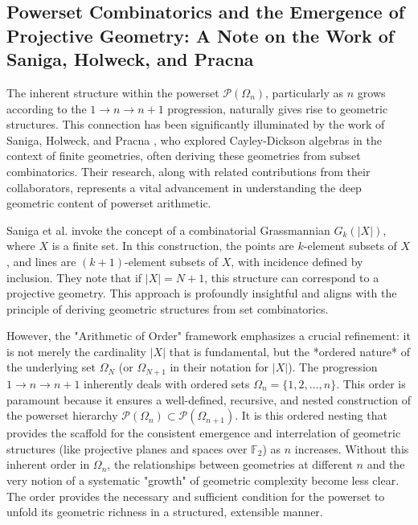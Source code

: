 \documentclass[11pt,a4paper]{article}
\begin{document}
\subsection{Powerset Combinatorics and the Emergence of Projective Geometry: A Note on the Work of Saniga, Holweck, and Pracna}
\label{sec:saniga_projective}

The inherent structure within the powerset $\mathcal{P}(\Omega_n)$, particularly as $n$ grows according to the $1 \to n \to n+1$ progression, naturally gives rise to geometric structures. This connection has been significantly illuminated by the work of Saniga, Holweck, and Pracna \cite{Saniga2014}, who explored Cayley-Dickson algebras in the context of finite geometries, often deriving these geometries from subset combinatorics. Their research, along with related contributions from their collaborators, represents a vital advancement in understanding the deep geometric content of powerset arithmetic.

Saniga et al. invoke the concept of a combinatorial Grassmannian $G_k(|X|)$, where $X$ is a finite set. In this construction, the points are $k$-element subsets of $X$, and lines are $(k+1)$-element subsets of $X$, with incidence defined by inclusion. They note that if $|X|=N+1$, this structure can correspond to a projective geometry. This approach is profoundly insightful and aligns with the principle of deriving geometric structures from set combinatorics.

However, the "Arithmetic of Order" framework emphasizes a crucial refinement: it is not merely the cardinality $|X|$ that is fundamental, but the *ordered nature* of the underlying set $\Omega_N$ (or $\Omega_{N+1}$ in their notation for $|X|$). The progression $1 \to n \to n+1$ inherently deals with ordered sets $\Omega_n = \{1, 2, \dots, n\}$. This order is paramount because it ensures a well-defined, recursive, and nested construction of the powerset hierarchy $\mathcal{P}(\Omega_n) \subset \mathcal{P}(\Omega_{n+1})$. It is this ordered nesting that provides the scaffold for the consistent emergence and interrelation of geometric structures (like projective planes and spaces over $\mathbb{F}_2$) as $n$ increases. Without this inherent order in $\Omega_n$, the relationships between geometries at different $n$ and the very notion of a systematic "growth" of geometric complexity become less clear. The order provides the necessary and sufficient condition for the powerset to unfold its geometric richness in a structured, extensible manner.
\end{document}
